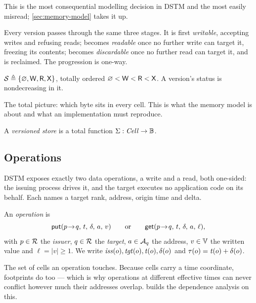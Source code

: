 This is the most consequential modelling decision in DSTM and the most easily
misread; \cref{sec:memory-model} takes it up.

Every version passes through the same three stages. It is first
\emph{writable}, accepting writes and refusing reads; becomes \emph{readable}
once no further write can target it, freezing its contents; becomes
\emph{discardable} once no further read can target it, and is reclaimed. The
progression is one-way.

\begin{definition}\label{def:status}
$\mathcal{S} \triangleq \{\varnothing, \mathsf{W}, \mathsf{R}, \mathsf{X}\}$, totally ordered
$\varnothing < \mathsf{W} < \mathsf{R} < \mathsf{X}$. A version's status is nondecreasing in it.
\end{definition}

The total picture: which byte sits in every cell. This is what the memory
model is about and what an implementation must reproduce.

\begin{definition}\label{def:store}
A \emph{versioned store} is a total function $\Sigma : \mathit{Cell} \to \mathbb{B}$.
\end{definition}

\subsection{Operations}
\label{sec:gloss-ops}

DSTM exposes exactly two data operations, a write and a read, both one-sided:
the issuing process drives it, and the target executes no application code on
its behalf. Each names a target rank, address, origin time and delta.

\begin{definition}[Operations]\label{def:operation}
An \emph{operation} is
\[
  \mathsf{put}(p\!\to\!q,\,t,\,\delta,\,a,\,v)
  \qquad\text{or}\qquad
  \mathsf{get}(p\!\to\!q,\,t,\,\delta,\,a,\,\ell),
\]
with $p \in \mathcal{R}$ the \emph{issuer}, $q \in \mathcal{R}$ the \emph{target},
$a \in \mathcal{A}_{q}$ the address, $v \in \mathbb{V}$ the written value and
$\ell = |v| \ge 1$. We write $\mathit{iss}(o), \mathit{tgt}(o), \mathit{t}(o), \delta(o)$
and $\tau(o) = \mathit{t}(o) + \delta(o)$.
\end{definition}

The set of cells an operation touches. Because cells carry a time coordinate,
footprints do too --- which is why operations at different effective times can
never conflict however much their addresses overlap.  builds
the dependence analysis on this.

